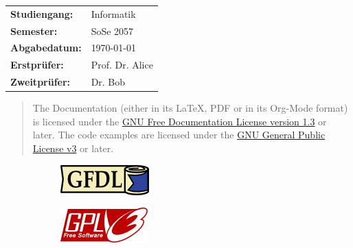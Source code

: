 \begin{titlepage}
	\begin{tabular}{ll}
		\textbf{Studiengang:} & Informatik      \\
		\textbf{Semester:}    & SoSe 2057       \\
		\textbf{Abgabedatum:} & \today          \\
		\textbf{Erstprüfer:}  & Prof. Dr. Alice \\
		\textbf{Zweitprüfer:} & Dr. Bob         \\
	\end{tabular}

	\begin{center}
		\vspace{.3cm}


		\begin{quote}
			{ \small
				The Documentation (either in its \LaTeX, PDF or in its Org-Mode format) is licensed under the
				\href{https://www.gnu.org/licenses/fdl-1.3.txt}{GNU Free Documentation License version 1.3}
				or later.  The code examples are licensed under the
				\href{https://www.gnu.org/licenses/gpl-3.0.txt}{GNU General Public License v3}
				or later. %
			}
		\end{quote}

		\begin{figure}[!hbt]
			\centering
			\begin{subfigure}{0.49\textwidth}
				\centering
				\includegraphics[height=.5cm]{images/gfdl.png}
				\label{fig:left1}
			\end{subfigure}
			\begin{subfigure}{0.49\textwidth}
				\centering
				\includegraphics[height=.5cm]{images/gplv3.png}
				\label{fig:right1}
			\end{subfigure}
			\label{fig:combined1}
		\end{figure}




\end{center}
\end{titlepage}
